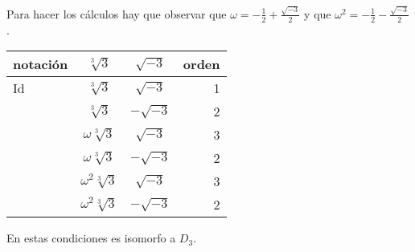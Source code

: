 \documentclass{article}
\theoremstyle{theorem-style}  %
\theoremstyle{definition-style}
\theoremstyle{example-style}
\begin{document}
\begin{enumerate}
Para hacer los cálculos hay que observar que $\omega = -\frac{1}{2} + \frac{\sqrt{-3}}{2}$ y que $\omega^2 = -\frac{1}{2} - \frac{\sqrt{-3}}{2}$.

\begin{center}
  \begin{tabular}{ l | c | c | r }
    \hline
    notación & $\sqrt[3]{3}$ & $\sqrt{-3}$ & orden \\ \hline
    Id & $\sqrt[3]{3}$ & $\sqrt{-3}$ & 1 \\ \hline
    & $\sqrt[3]{3}$ & $-\sqrt{-3}$ & 2 \\ \hline
    & $\omega \sqrt[3]{3}$ & $\sqrt{-3}$ & 3 \\ \hline
    & $\omega \sqrt[3]{3}$ & $-\sqrt{-3}$ & 2 \\ \hline
    & $\omega^2 \sqrt[3]{3}$ & $\sqrt{-3}$ & 3 \\ \hline
    & $\omega^2 \sqrt[3]{3}$ & $-\sqrt{-3}$ & 2 \\
    \hline
  \end{tabular}
\end{center}

En estas condiciones es isomorfo a $D_3$.

\end{enumerate}



\printbibliography
\end{document}

